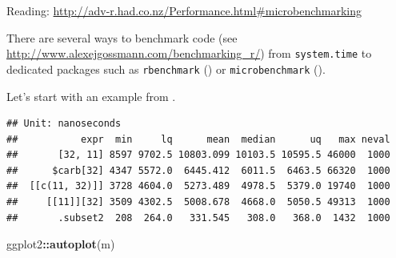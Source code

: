 \documentclass[]{book}
\newenvironment{Shaded}{\begin{snugshade}}{\end{snugshade}}
\newcommand{\KeywordTok}[1]{\textcolor[rgb]{0.13,0.29,0.53}{\textbf{#1}}}
\newcommand{\DataTypeTok}[1]{\textcolor[rgb]{0.13,0.29,0.53}{#1}}
\newcommand{\DecValTok}[1]{\textcolor[rgb]{0.00,0.00,0.81}{#1}}
\newcommand{\StringTok}[1]{\textcolor[rgb]{0.31,0.60,0.02}{#1}}
\newcommand{\CommentTok}[1]{\textcolor[rgb]{0.56,0.35,0.01}{\textit{#1}}}
\newcommand{\OperatorTok}[1]{\textcolor[rgb]{0.81,0.36,0.00}{\textbf{#1}}}
\newcommand{\NormalTok}[1]{#1}
\theoremstyle{definition}
\theoremstyle{definition}
\theoremstyle{definition}
\theoremstyle{remark}
\begin{document}
Reading:
\url{http://adv-r.had.co.nz/Performance.html\#microbenchmarking}

There are several ways to benchmark code (see
\url{http://www.alexejgossmann.com/benchmarking_r/}) from
\texttt{system.time} to dedicated packages such as \texttt{rbenchmark}
(\citet{rbenchmark}) or \texttt{microbenchmark}
(\citet{microbenchmark}).

Let's start with an example from \citet{Wickham2014}.

\begin{Shaded}
\end{Shaded}

\begin{verbatim}
## Unit: nanoseconds
##           expr  min     lq      mean  median      uq   max neval
##       [32, 11] 8597 9702.5 10803.099 10103.5 10595.5 46000  1000
##      $carb[32] 4347 5572.0  6445.412  6011.5  6463.5 66320  1000
##  [[c(11, 32)]] 3728 4604.0  5273.489  4978.5  5379.0 19740  1000
##     [[11]][32] 3509 4302.5  5008.678  4668.0  5050.5 49313  1000
##       .subset2  208  264.0   331.545   308.0   368.0  1432  1000
\end{verbatim}

\begin{Shaded}
\begin{Highlighting}[]
\NormalTok{ggplot2}\OperatorTok{::}\KeywordTok{autoplot}\NormalTok{(m)}
\end{Highlighting}
\end{Shaded}
\end{document}
